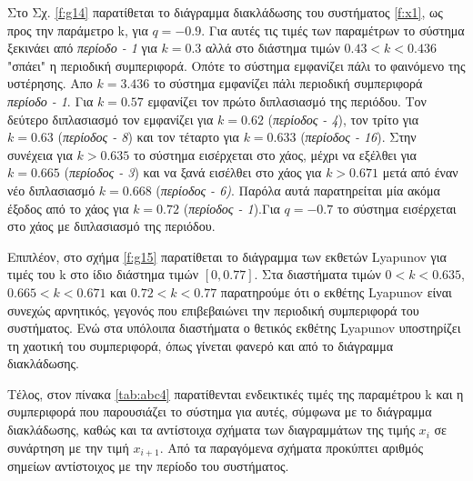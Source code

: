 Στο Σχ. \ref{f:g14} παρατίθεται το διάγραμμα διακλάδωσης του συστήματος \ref{f:x1}, ως προς την παράμετρο k, για $q =- 0.9$. Για αυτές τις τιμές των παραμέτρων το σύστημα ξεκινάει από \emph{περίοδο - 1} για $k=0.3$ αλλά στο διάστημα τιμών $0.43<k<0.436$ "σπάει" η περιοδική συμπεριφορά. Οπότε το σύστημα εμφανίζει πάλι το φαινόμενο της υστέρησης. Απο $k=3.436$ το σύστημα εμφανίζει πάλι περιοδική συμπεριφορά \emph{περίοδο - 1}. Για  $k = 0.57$ εμφανίζει τον πρώτο διπλασιασμό της περιόδου. Τον δεύτερο διπλασιασμό τον εμφανίζει για $k=0.62$ (\emph{περίοδος - 4}), τον τρίτο για $k=0.63$ (\emph{περίοδος - 8}) και τον τέταρτο για $k=0.633$ (\emph{περίοδος - 16}). Στην συνέχεια για $k>0.635$ το σύστημα εισέρχεται στο χάος, μέχρι να εξέλθει για $k=0.665$ (\emph{περίοδος - 3}) και να ξανά εισέλθει στο χάος για $k>0.671$ μετά από έναν νέο διπλασιασμό $k=0.668$ (\emph{περίοδος - 6)}. Παρόλα αυτά παρατηρείται μία ακόμα έξοδος από το χάος για $k=0.72$ (\emph{περίοδος - 1}).Για $q=-0.7$ το σύστημα εισέρχεται στο χάος με διπλασιασμό της περιόδου.

Επιπλέον, στο σχήμα \ref{f:g15} παρατίθεται το διάγραμμα των εκθετών Lyapunov για τιμές του k στο ίδιο διάστημα τιμών $[0, 0.77]$. Στα διαστήματα τιμών $0<k<0.635$, $0.665<k<0.671$ και $0.72<k<0.77$ παρατηρούμε ότι ο εκθέτης Lyapunov είναι συνεχώς αρνητικός, γεγονός που επιβεβαιώνει την περιοδική συμπεριφορά του συστήματος. Ενώ στα υπόλοιπα διαστήματα ο θετικός εκθέτης Lyapunov υποστηρίζει τη χαοτική του συμπεριφορά, όπως γίνεται φανερό και από το διάγραμμα διακλάδωσης.

Τέλος, στον πίνακα \ref{tab:abc4} παρατίθενται ενδεικτικές τιμές της παραμέτρου k και η συμπεριφορά που παρουσιάζει το σύστημα για αυτές, σύμφωνα με το διάγραμμα διακλάδωσης, καθώς και τα αντίστοιχα σχήματα των διαγραμμάτων της τιμής \(x_i\) σε συνάρτηση με την τιμή \(x_{i+1}\). Από τα παραγόμενα σχήματα προκύπτει αριθμός σημείων αντίστοιχος με την περίοδο του συστήματος.\\\\


